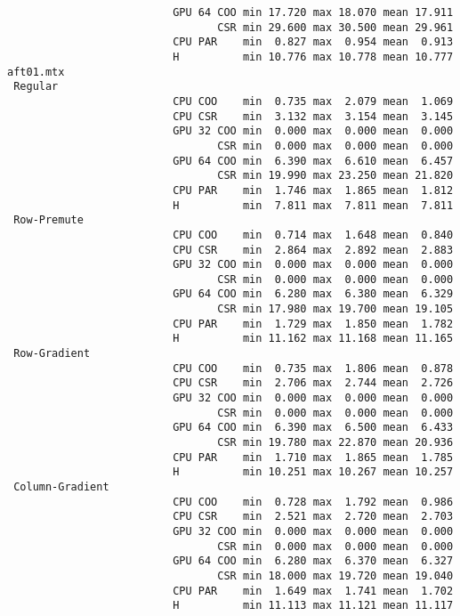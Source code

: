 \begin{verbatim}
                          GPU 64 COO min 17.720 max 18.070 mean 17.911
                                 CSR min 29.600 max 30.500 mean 29.961
                          CPU PAR    min  0.827 max  0.954 mean  0.913
                          H          min 10.776 max 10.778 mean 10.777
aft01.mtx
 Regular
                          CPU COO    min  0.735 max  2.079 mean  1.069
                          CPU CSR    min  3.132 max  3.154 mean  3.145
                          GPU 32 COO min  0.000 max  0.000 mean  0.000
                                 CSR min  0.000 max  0.000 mean  0.000
                          GPU 64 COO min  6.390 max  6.610 mean  6.457
                                 CSR min 19.990 max 23.250 mean 21.820
                          CPU PAR    min  1.746 max  1.865 mean  1.812
                          H          min  7.811 max  7.811 mean  7.811
 Row-Premute
                          CPU COO    min  0.714 max  1.648 mean  0.840
                          CPU CSR    min  2.864 max  2.892 mean  2.883
                          GPU 32 COO min  0.000 max  0.000 mean  0.000
                                 CSR min  0.000 max  0.000 mean  0.000
                          GPU 64 COO min  6.280 max  6.380 mean  6.329
                                 CSR min 17.980 max 19.700 mean 19.105
                          CPU PAR    min  1.729 max  1.850 mean  1.782
                          H          min 11.162 max 11.168 mean 11.165
 Row-Gradient
                          CPU COO    min  0.735 max  1.806 mean  0.878
                          CPU CSR    min  2.706 max  2.744 mean  2.726
                          GPU 32 COO min  0.000 max  0.000 mean  0.000
                                 CSR min  0.000 max  0.000 mean  0.000
                          GPU 64 COO min  6.390 max  6.500 mean  6.433
                                 CSR min 19.780 max 22.870 mean 20.936
                          CPU PAR    min  1.710 max  1.865 mean  1.785
                          H          min 10.251 max 10.267 mean 10.257
 Column-Gradient
                          CPU COO    min  0.728 max  1.792 mean  0.986
                          CPU CSR    min  2.521 max  2.720 mean  2.703
                          GPU 32 COO min  0.000 max  0.000 mean  0.000
                                 CSR min  0.000 max  0.000 mean  0.000
                          GPU 64 COO min  6.280 max  6.370 mean  6.327
                                 CSR min 18.000 max 19.720 mean 19.040
                          CPU PAR    min  1.649 max  1.741 mean  1.702
                          H          min 11.113 max 11.121 mean 11.117

\end{verbatim}
